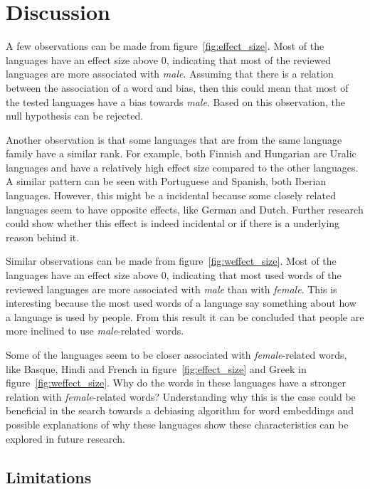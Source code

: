 \section{Discussion}
A few observations can be made from figure~\ref{fig:effect_size}. Most
of the languages have an effect size above 0, indicating that most of the reviewed
languages are more associated with \emph{male}. Assuming that there is a relation between
the association of a word and bias, then this could mean that
most of the tested languages have a bias towards \emph{male}. Based on this observation,
the null hypothesis can be rejected.

Another observation is that some languages that are from the same language family have
a similar rank. For example, both Finnish and Hungarian are Uralic languages and have a
relatively high effect size compared to the other languages. A similar pattern can be seen
with Portuguese and Spanish, both Iberian languages. However, this might be a incidental
because some closely related languages seem to have opposite effects, like German and
Dutch. Further research could show whether this effect is indeed incidental or if
there is a underlying reason behind it.

Similar observations can be made from figure~\ref{fig:weffect_size}. Most
of the languages have an effect size above 0, indicating that most used words of the
reviewed languages are more associated with \emph{male} than with \emph{female}. This
is interesting because the most used words of a language say something about how a
language is used by people.
From this result it can be concluded that people are more inclined to use
\mbox{\emph{male}-related words}.

Some of the languages seem to be closer associated with \emph{female}-related words, like
Basque, Hindi and French in figure~\ref{fig:effect_size} and Greek in
figure~\ref{fig:weffect_size}. Why do the words in these languages have a stronger
relation with \emph{female}-related words?
Understanding why this is
the case could be beneficial in the search towards a debiasing algorithm for word
embeddings and possible explanations of why these languages show these characteristics can
be explored in future research.

\subsection{Limitations}


